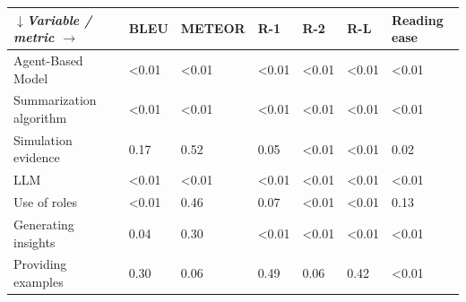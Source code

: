 \begin{tabular}{|l|l|l|l|l|l|l|}
\hline
\textit{$\downarrow$Variable / metric $\rightarrow$} & BLEU & METEOR & R-1 & R-2 & R-L & Reading ease \\
 \hline
 Agent-Based Model & \textless{}0.01 & \textless{}0.01 & \textless{}0.01 & \textless{}0.01 & \textless{}0.01 & \textless{}0.01 \\
 \hline
 Summarization algorithm & \textless{}0.01 & \textless{}0.01 & \textless{}0.01 & \textless{}0.01 & \textless{}0.01 & \textless{}0.01 \\
 \hline
 Simulation evidence & 0.17 & 0.52 & 0.05 & \textless{}0.01 & \textless{}0.01 & 0.02 \\
 \hline
 LLM & \textless{}0.01 & \textless{}0.01 & \textless{}0.01 & \textless{}0.01 & \textless{}0.01 & \textless{}0.01 \\
 \hline
 Use of roles & \textless{}0.01 & 0.46 & 0.07 & \textless{}0.01 & \textless{}0.01 & 0.13 \\
 \hline
 Generating insights & 0.04 & 0.30 & \textless{}0.01 & \textless{}0.01 & \textless{}0.01 & \textless{}0.01 \\
 \hline
 Providing examples & 0.30 & 0.06 & 0.49 & 0.06 & 0.42 & \textless{}0.01 \\
\hline
\end{tabular}
